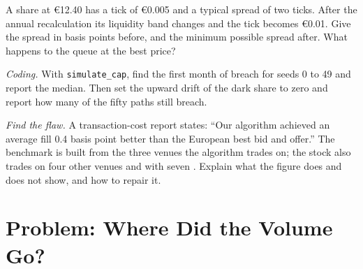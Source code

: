 \begin{exercise}[$\star\star$]\label{exo:m1:european-equity-market-structure:6}
A share at \euro 12.40 has a tick of \euro 0.005 and a typical spread of two
ticks. After the annual recalculation its liquidity band changes and the tick
becomes \euro 0.01. Give the spread in basis points before, and the minimum
possible spread after. What happens to the queue at the best price?
\end{exercise}

\begin{exercise}[$\star\star\star$]\label{exo:m1:european-equity-market-structure:7}
\emph{Coding.} With \texttt{simulate\_cap}, find the first month of breach for
seeds 0 to 49 and report the median. Then set the upward drift of the dark
share to zero and report how many of the fifty paths still breach.
\end{exercise}

\begin{exercise}[$\star\star\star$]\label{exo:m1:european-equity-market-structure:8}
\emph{Find the flaw.} A transaction-cost report states: ``Our algorithm
achieved an average fill 0.4 basis point better than the European best bid
and offer.'' The benchmark is built from the three venues the algorithm
trades on; the stock also trades on four other venues and with seven
. Explain what the figure does and does not show, and
how to repair it.
\end{exercise}

\section{Problem: Where Did the Volume Go?}

